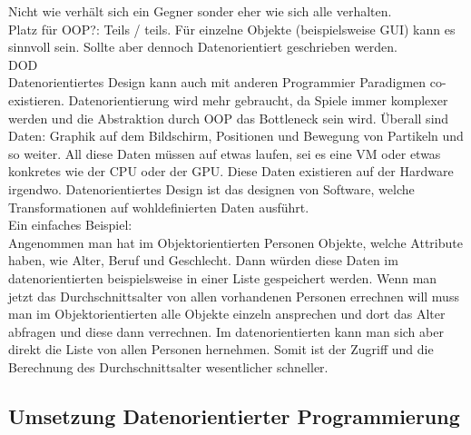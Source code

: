 \documentclass[12pt, titlepage]{article}
\DeclareRobustCommand{\#}{\adjustbox{valign=B,totalheight=.57\baselineskip}{\oldhash}}%
\begin{document}
Nicht wie verhält sich ein Gegner sonder eher wie sich alle verhalten.\\Platz für OOP?: Teils / teils. Für einzelne Objekte (beispielsweise GUI) kann es sinnvoll sein. Sollte aber dennoch Datenorientiert geschrieben werden.
\\ DOD \cite{DOD}\\
Datenorientiertes Design kann auch mit anderen Programmier Paradigmen co-existieren. Datenorientierung wird mehr gebraucht, da Spiele immer komplexer werden und die Abstraktion durch OOP das Bottleneck sein wird. Überall sind Daten: Graphik auf dem Bildschirm, Positionen und Bewegung von Partikeln und so weiter. All diese Daten müssen auf etwas laufen, sei es eine VM oder etwas konkretes wie der CPU oder der GPU. Diese Daten existieren auf der Hardware irgendwo. Datenorientiertes Design ist das designen von Software, welche Transformationen auf wohldefinierten Daten ausführt. \\
Ein einfaches Beispiel:\\Angenommen man hat im Objektorientierten Personen Objekte, welche Attribute haben, wie Alter, Beruf und Geschlecht. Dann würden diese Daten im datenorientierten beispielsweise in einer Liste gespeichert werden. Wenn man jetzt das Durchschnittsalter von allen vorhandenen Personen errechnen will muss man im Objektorientierten alle Objekte einzeln ansprechen und dort das Alter abfragen und diese dann verrechnen. Im datenorientierten kann man sich aber direkt die Liste von allen Personen hernehmen. Somit ist der Zugriff und die Berechnung des Durchschnittsalter wesentlicher schneller.
\subsection{Umsetzung Datenorientierter Programmierung}
\newpage
\end{document}
